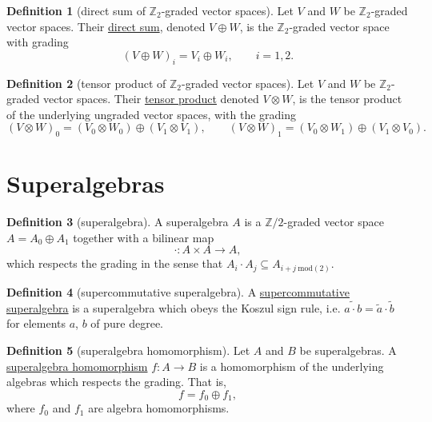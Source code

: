 \documentclass[a4paper]{report}
\newcommand{\Z}{\mathbb{Z}}
\newcommand{\defn}[1]{\ul{#1}}
\theoremstyle{definition}
\newtheorem{definition}{Definition}[section]
\theoremstyle{plain}
\theoremstyle{remark}
\begin{document}
\begin{definition}[direct sum of $\Z_{2}$-graded vector spaces]
  \label{def:directsumofz2gradedvectorspaces}
  Let $V$ and $W$ be $\Z_{2}$-graded vector spaces. Their \defn{direct sum}, denoted $V \oplus W$, is the $\Z_{2}$-graded vector space with grading
  \begin{equation*}
    (V \oplus W)_{i} = V_{i} \oplus W_{i},\qquad i = 1, 2.
  \end{equation*}
\end{definition} 
\begin{definition}[tensor product of $\Z_{2}$-graded vector spaces]
  \label{def:tensorproduttofz2gradedvectorspaces}
  Let $V$ and $W$ be $\Z_{2}$-graded vector spaces. Their \defn{tensor product} denoted $V \otimes W$, is the tensor product of the underlying ungraded vector spaces, with the grading
  \begin{equation*}
    (V \otimes W)_{0} = (V_{0} \otimes W_{0})\oplus(V_{1} \otimes V_{1}),\qquad (V \otimes W)_{1} = (V_{0} \otimes W_{1})\oplus(V_{1} \otimes V_{0}).
  \end{equation*}
\end{definition}

\section{Superalgebras}

\begin{definition}[superalgebra]
  \label{def:superalgebra}
  A superalgebra $A$ is a $\Z/2$-graded vector space $A = A_{0} \oplus A_{1}$ together with a bilinear map
  \begin{equation*}
    \cdot\colon A \times A \to A,
  \end{equation*}
  which respects the grading in the sense that $A_{i} \cdot A_{j} \subseteq A_{i+j\ \mathrm{mod}(2)}$.
\end{definition}

\begin{definition}[supercommutative superalgebra]
  \label{def:supercommutativesuperalgebra}
  A \defn{supercommutative superalgebra} is a superalgebra which obeys the Koszul sign rule, i.e.  $\widetilde{a \cdot b} = \tilde{a} \cdot \tilde{b}$ for elements $a$, $b$ of pure degree.
\end{definition}

\begin{definition}[superalgebra homomorphism]
  \label{def:superalgebrahomomorphism}
  Let $A$ and $B$ be superalgebras. A \defn{superalgebra homomorphism} $f\colon A \to B$ is a homomorphism of the underlying algebras which respects the grading. That is, 
  \begin{equation*}
    f = f_{0} \oplus f_{1},
  \end{equation*}
  where $f_{0}$ and $f_{1}$ are algebra homomorphisms.
\end{definition}
\end{document}
